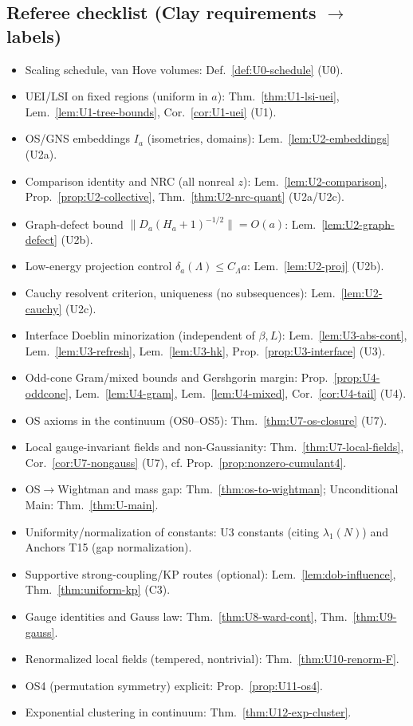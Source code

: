 \documentclass[11pt]{amsart}
\theoremstyle{plain}
\theoremstyle{definition}
\theoremstyle{remark}
\begin{document}
\subsection*{Referee checklist (Clay requirements $\to$ labels)}
\begin{itemize}
  \item Scaling schedule, van Hove volumes: Def.~\ref{def:U0-schedule} (U0).
  \item UEI/LSI on fixed regions (uniform in $a$): Thm.~\ref{thm:U1-lsi-uei}, Lem.~\ref{lem:U1-tree-bounds}, Cor.~\ref{cor:U1-uei} (U1).
  \item OS/GNS embeddings $I_a$ (isometries, domains): Lem.~\ref{lem:U2-embeddings} (U2a).
  \item Comparison identity and NRC (all nonreal $z$): Lem.~\ref{lem:U2-comparison}, Prop.~\ref{prop:U2-collective}, Thm.~\ref{thm:U2-nrc-quant} (U2a/U2c).
  \item Graph-defect bound $\|D_a(H_a+1)^{-1/2}\|=O(a)$: Lem.~\ref{lem:U2-graph-defect} (U2b).
  \item Low-energy projection control $\delta_a(\Lambda)\le C_\Lambda a$: Lem.~\ref{lem:U2-proj} (U2b).
  \item Cauchy resolvent criterion, uniqueness (no subsequences): Lem.~\ref{lem:U2-cauchy} (U2c).
  \item Interface Doeblin minorization (independent of $\beta,L$): Lem.~\ref{lem:U3-abs-cont}, Lem.~\ref{lem:U3-refresh}, Lem.~\ref{lem:U3-hk}, Prop.~\ref{prop:U3-interface} (U3).
  \item Odd-cone Gram/mixed bounds and Gershgorin margin: Prop.~\ref{prop:U4-oddcone}, Lem.~\ref{lem:U4-gram}, Lem.~\ref{lem:U4-mixed}, Cor.~\ref{cor:U4-tail} (U4).
  \item OS axioms in the continuum (OS0–OS5): Thm.~\ref{thm:U7-os-closure} (U7).
  \item Local gauge-invariant fields and non-Gaussianity: Thm.~\ref{thm:U7-local-fields}, Cor.~\ref{cor:U7-nongauss} (U7), cf. Prop.~\ref{prop:nonzero-cumulant4}.
  \item OS$\to$Wightman and mass gap: Thm.~\ref{thm:os-to-wightman}; Unconditional Main: Thm.~\ref{thm:U-main}.
  \item Uniformity/normalization of constants: U3 constants (citing $\lambda_1(N)$) and Anchors T15 (gap normalization).
  \item Supportive strong-coupling/KP routes (optional): Lem.~\ref{lem:dob-influence}, Thm.~\ref{thm:uniform-kp} (C3).
  \item Gauge identities and Gauss law: Thm.~\ref{thm:U8-ward-cont}, Thm.~\ref{thm:U9-gauss}.
  \item Renormalized local fields (tempered, nontrivial): Thm.~\ref{thm:U10-renorm-F}.
  \item OS4 (permutation symmetry) explicit: Prop.~\ref{prop:U11-os4}.
  \item Exponential clustering in continuum: Thm.~\ref{thm:U12-exp-cluster}.
\end{itemize}
\end{document}
